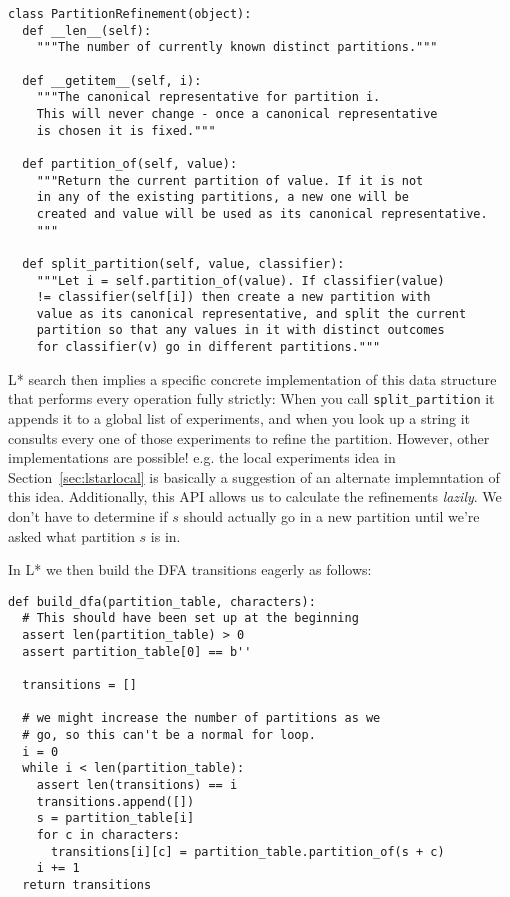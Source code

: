 \documentclass[a4paper]{book}
\begin{document}
\begin{lstlisting}
class PartitionRefinement(object):
  def __len__(self):
    """The number of currently known distinct partitions."""

  def __getitem__(self, i):
    """The canonical representative for partition i.
    This will never change - once a canonical representative
    is chosen it is fixed."""

  def partition_of(self, value):
    """Return the current partition of value. If it is not
    in any of the existing partitions, a new one will be
    created and value will be used as its canonical representative.
    """

  def split_partition(self, value, classifier):
    """Let i = self.partition_of(value). If classifier(value)
    != classifier(self[i]) then create a new partition with
    value as its canonical representative, and split the current
    partition so that any values in it with distinct outcomes
    for classifier(v) go in different partitions."""
\end{lstlisting}

L* search then implies a specific concrete implementation of this data structure that performs every operation fully strictly:
When you call \texttt{split\_partition} it appends it to a global list of experiments,
and when you look up a string it consults every one of those experiments to refine the partition.
However, other implementations are possible!
e.g. the local experiments idea in Section~\ref{sec:lstarlocal} is basically a suggestion of an alternate implemntation of this idea.
Additionally,
this API allows us to calculate the refinements \emph{lazily}.
We don't have to determine if \(s\) should actually go in a new partition until we're asked what partition \(s\) is in.

In L* we then build the DFA transitions eagerly as follows:

\begin{lstlisting}
def build_dfa(partition_table, characters):
  # This should have been set up at the beginning
  assert len(partition_table) > 0
  assert partition_table[0] == b''

  transitions = []

  # we might increase the number of partitions as we
  # go, so this can't be a normal for loop.
  i = 0  
  while i < len(partition_table):
    assert len(transitions) == i
    transitions.append([])
    s = partition_table[i]
    for c in characters:
      transitions[i][c] = partition_table.partition_of(s + c)
    i += 1
  return transitions
\end{lstlisting}
\end{document}
